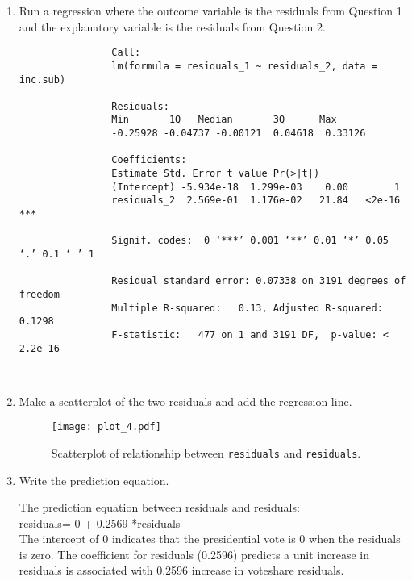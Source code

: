 \documentclass[12pt,letterpaper]{article}
\begin{document}
	\begin{enumerate}
		\item Run a regression where the outcome variable is the residuals from Question 1 and the explanatory variable is the residuals from Question 2.	
		
		\vspace{.15cm}
		 
		\vspace{.15cm}
		\begin{footnotesize}
			\begin{verbatim}
				Call:
				lm(formula = residuals_1 ~ residuals_2, data = inc.sub)
				
				Residuals:
				Min       1Q   Median       3Q      Max 
				-0.25928 -0.04737 -0.00121  0.04618  0.33126 
				
				Coefficients:
				Estimate Std. Error t value Pr(>|t|)    
				(Intercept) -5.934e-18  1.299e-03    0.00        1    
				residuals_2  2.569e-01  1.176e-02   21.84   <2e-16 ***
				---
				Signif. codes:  0 ‘***’ 0.001 ‘**’ 0.01 ‘*’ 0.05 ‘.’ 0.1 ‘ ’ 1
				
				Residual standard error: 0.07338 on 3191 degrees of freedom
				Multiple R-squared:   0.13,	Adjusted R-squared:  0.1298 
				F-statistic:   477 on 1 and 3191 DF,  p-value: < 2.2e-16
				
				
			\end{verbatim}
		\end{footnotesize}
		
		\item Make a scatterplot of the two residuals and add the regression line. 	
		\vspace{.15cm}
		 
		\vspace{.15cm}
		\begin{figure}[h!]\centering
			
			\caption{\footnotesize Scatterplot of relationship between \texttt{residuals} and \texttt{residuals}.}
			\label{fig:plot_4}
			\texttt{[image: plot\_4.pdf]}
		\end{figure}
		\item Write the prediction equation.
		
		\vspace{.15cm}
		 
		\vspace{.15cm}
		\noindent The prediction equation between residuals and residuals:\\
		\vspace{.25cm}
		residuals= 0 + 0.2569 *residuals\\
		\noindent The intercept of 0 indicates that the presidential vote is 0 when the residuals is zero. 
		The coefficient for residuals (0.2596) predicts a unit increase in residuals is associated with 0.2596 increase in voteshare	residuals.
	\end{enumerate}
	
\end{document}
